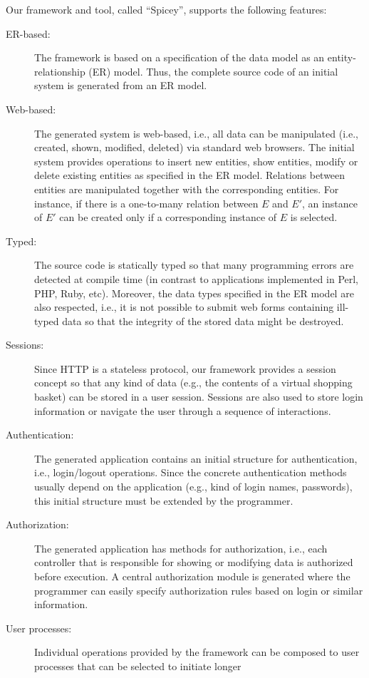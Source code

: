 \documentclass{tlp}
\begin{document}
Our framework and tool, called ``Spicey'', supports the following features:
\begin{description}
\item[ER-based:]
The framework is based on a specification of the data model
as an entity-relationship (ER) model. Thus, the complete source code
of an initial system is generated from an ER model.
\item[Web-based:]
The generated system is web-based, i.e., all data can be manipulated (i.e.,
created, shown, modified, deleted) via standard web browsers.
The initial system provides operations to insert new entities,
show entities, modify or delete existing entities
as specified in the ER model.
Relations between entities are manipulated together with
the corresponding entities. For instance, if there is a
one-to-many relation between $E$ and $E'$,
an instance of $E'$ can be created only if a corresponding instance
of $E$ is selected.
\item[Typed:]
The source code is statically typed so that many programming errors are
detected at compile time (in contrast to applications implemented
in Perl, PHP, Ruby, etc). Moreover, the data types
specified in the ER model are also respected, i.e., it is not
possible to submit web forms containing ill-typed data
so that the integrity of the stored data might be destroyed.
\item[Sessions:]
Since HTTP is a stateless protocol,
our framework provides a session concept so that any kind
of data (e.g., the contents of a virtual shopping basket)
can be stored in a user session.
Sessions are also used to store login information or
navigate the user through a sequence of interactions.
\item[Authentication:]
The generated application contains an initial structure
for authentication, i.e., login/logout operations.
Since the concrete authentication methods usually depend
on the application (e.g., kind of login names, passwords),
this initial structure must be extended by the programmer.
\item[Authorization:]
The generated application has methods for authorization,
i.e., each controller that is responsible for showing or modifying
data is authorized before execution.
A central authorization module is generated where the programmer
can easily specify authorization rules based on login or similar information.
\item[User processes:]
Individual operations provided by the framework can be
composed to user processes that can be selected to initiate longer

\end{description}
\end{document}
